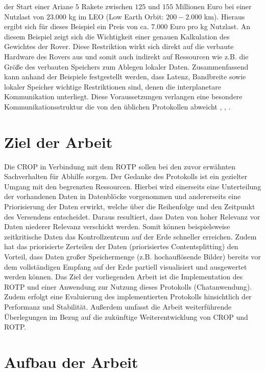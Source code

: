 der Start einer Ariane $5$ Rakete zwischen $125$ und $155$ Millionen Euro bei 
einer Nutzlast von $23.000$ kg im LEO (Low Earth Orbit: $200-2.000$ km).
Hieraus ergibt sich f{\"u}r dieses Beispiel ein Preis von ca. $7.000$ Euro pro kg 
Nutzlast. An diesem Beispiel zeigt sich die Wichtigkeit einer genauen
Kalkulation des Gewichtes der Rover. Diese Restriktion wirkt sich direkt auf die
verbaute Hardware des Rovers aus und somit auch indirekt auf Ressourcen wie z.B.
die Gr{\"o}{\ss}e des verbauten Speichers zum Ablegen lokaler Daten.\newline
Zusammenfassend kann anhand der Beispiele festgestellt werden, dass Latenz, 
Bandbreite sowie lokaler Speicher wichtige Restriktionen sind, denen die 
interplanetare Kommunikation unterliegt. Diese Voraussetzungen verlangen 
eine besondere Kommunikationsstruktur die von den {\"u}blichen Protokollen 
abweicht \cite{web5}, \cite{web12}, \cite{web13}. 

\section{Ziel der Arbeit}

Die \gls{CROP} in Verbindung mit dem \gls{ROTP} sollen bei den zuvor
erw{\"a}hnten Sachverhalten f{\"u}r Abhilfe sorgen. Der Gedanke des Protokolls
ist ein gezielter Umgang mit den begrenzten Ressourcen. Hierbei wird einerseits
eine Unterteilung der vorhandenen Daten in Datenbl{\"o}cke vorgenommen und
andererseits eine Priorisierung der Daten erwirkt, welche {\"u}ber die
Reihenfolge und den Zeitpunkt des Versendens entscheidet. Daraus resultiert,
dass Daten von hoher Relevanz vor Daten niederer Relevanz verschickt werden.
Somit k{\"o}nnen beispielsweise zeitkritische Daten das Kontrollzentrum auf der
Erde schneller erreichen. Zudem hat das priorisierte Zerteilen der Daten
(priorisiertes Contentsplitting) den Vorteil, dass Daten gro{\ss}er
Speichermenge (z.B.
hochaufl{\"o}sende Bilder) bereits vor dem vollst{\"a}ndigen Empfang auf der
Erde partiell visualisiert und ausgewertet werden k{\"o}nnen. Das Ziel der
vorliegenden Arbeit ist die Implementation des \gls{ROTP} und einer Anwendung
zur Nutzung dieses Protokolls (Chatanwendung). Zudem erfolgt eine Evaluierung
des implementierten Protokolls hinsichtlich der Performanz und Stabilit{\"a}t.
Au{\ss}erdem umfasst die Arbeit weiterf{\"u}hrende {\"U}berlegungen im Bezug auf
die zuk{\"u}nftige Weiterentwicklung von \gls{CROP} und \gls{ROTP}.

\section{Aufbau der Arbeit}

